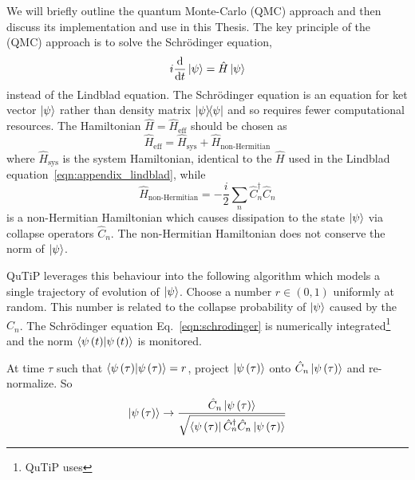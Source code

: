 We will briefly outline the quantum Monte-Carlo (QMC) approach and then discuss its implementation and use in this Thesis. The key principle of the (QMC) approach is to solve the Schr{\"o}dinger equation,
\begin{equation}\label{eqn:schrodinger}
i \frac{\mathrm{d}}{\mathrm{d}t} \ket{\psi} = \hat{H}\ket{\psi}
\end{equation}
instead of the Lindblad equation. The Schr{\"o}dinger equation is an equation for ket vector $\ket{\psi}$ rather than density matrix $\dyad{\psi}$ and so requires fewer computational resources. The Hamiltonian $\hat{H} = \hat{H}_{\text{eff}}$ should be chosen as
\begin{equation}
\hat{H}_{\text{eff}} = \hat{H}_{\text{sys}} + \hat{H}_{\text{non-Hermitian}}
\end{equation}
where $\hat{H}_{\text{sys}}$ is the system Hamiltonian, identical to the $\hat{H}$ used in the Lindblad equation~\ref{eqn:appendix_lindblad}, while 
\begin{equation}
\hat{H}_{\text{non-Hermitian}} = -\frac{i}{2} \sum_n \hat{C}_n^\dagger \hat{C}_n
\end{equation}
is a non-Hermitian Hamiltonian which causes dissipation to the state $\ket{\psi}$ via collapse operators $\hat{C}_n$. The non-Hermitian Hamiltonian does not conserve the norm of $\ket{\psi}$. 


 

QuTiP leverages this behaviour into the following algorithm which models a single trajectory of evolution of $\ket{\psi}$.  Choose a number $r \in \left(0, 1\right)$ uniformly at random. This number is related to the collapse probability of $\ket{\psi}$ caused by the $\hat{C}_n$. The Schr{\"o}dinger equation Eq.~\ref{eqn:schrodinger} is numerically integrated\footnote{QuTiP uses } and the norm $\bra{\psi\left(t\right)}\ket{\psi\left(t\right)}$ is monitored. 

At time $\tau$ such that $\bra{\psi\left(\tau\right)}\ket{\psi\left(\tau\right)} = r$, project $\ket{\psi\left(\tau\right)}$ onto $\hat{C}_n \ket{\psi\left(\tau\right)}$ and re-normalize. So
\begin{equation}
\ket{\psi\left(\tau\right)} \rightarrow \frac{\hat{C}_n \ket{\psi\left(\tau\right)}}{\sqrt{\bra{\psi\left(\tau\right)}\hat{C}_n^\dagger \hat{C}_n \ket{\psi\left(\tau\right)}}}
\end{equation}

